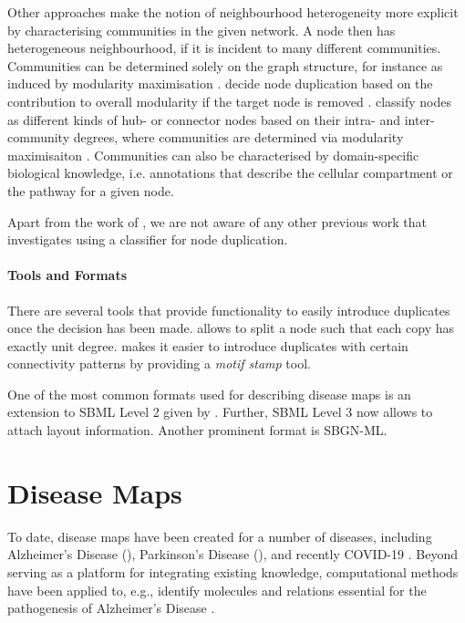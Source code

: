 \documentclass[
	fontsize=10pt, %
	twoside=false, %
	secnumdepth=1, %
  toc=indentunnumbered %
]{kaobook}
\begin{document}
Other approaches make the notion of neighbourhood heterogeneity more explicit by
characterising communities in the given network. A node then has heterogeneous
neighbourhood, if it is incident to many different communities. Communities can
be determined solely on the graph structure, for instance as induced by
modularity maximisation \cite{newman_modularity_2006}.
\citeauthor{huss_CurrencyCommodityMetabolites_2007} decide node duplication
based on the contribution to overall modularity if the target node is removed
\cite{huss_CurrencyCommodityMetabolites_2007}.
\citeauthor{guimera_FunctionalCartographyComplex_2005} classify nodes as
different kinds of hub- or connector nodes based on their intra- and
inter-community degrees, where communities are determined via modularity maximisaiton
\cite{guimera_FunctionalCartographyComplex_2005}. Communities can also be
characterised by domain-specific biological knowledge, i.e. annotations that
describe the cellular compartment \cite{manipur_clustering_2020} or the pathway 
\cite{rohrschneider_NovelGridBasedVisualization_2010}
\cite{joshi-tope_ReactomeKnowledgebaseBiological_2005} for a given node.

Apart from the work of \citeauthor{nielsen_MachineLearningSupport_2019}, we are
not aware of any other previous work that investigates using a classifier for
node duplication.



\paragraph{Tools and Formats}
There are several tools that
provide functionality to easily introduce duplicates once the decision has been
made.
 \cite{villeger_ArcadiaVisualizationTool_2010}
allows to split a node such that each copy has exactly unit degree.
 \cite{droste_OmixVisualizationTool_2013} makes it easier to
introduce duplicates with certain connectivity patterns by providing a
\textit{motif stamp} tool.

One of the most common formats used for describing disease maps is an extension to SBML
Level 2 given by . Further, SBML Level 3 now allows to attach
layout information. Another prominent format is SBGN-ML.


\section{Disease Maps}
To date, disease maps have been created for a number of diseases, including
Alzheimer's Disease (\alzpathway \cite{ogishima_AlzPathwayUpdatedMap_2016}),
Parkinson's Disease (\pdmap \cite{fujita_IntegratingPathwaysParkinson_2014}),
and recently \textsc{COVID-19}
\cite{ostaszewski_COVID19DiseaseMap_2020}. Beyond serving as a platform for
integrating existing knowledge, computational methods have been applied to,
e.g., identify molecules and relations essential for the pathogenesis of Alzheimer's
Disease \cite{mizuno_NetworkAnalysisComprehensive_2016}.
\end{document}
